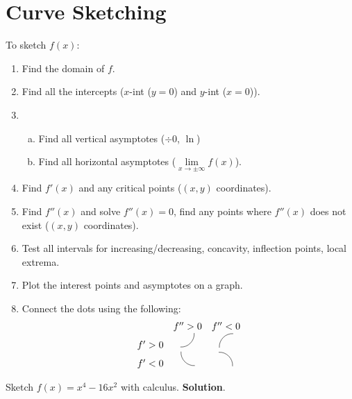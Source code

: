 \section{Curve Sketching}
To sketch $ f(x) $:
\begin{enumerate}[(1)]
    \item Find the domain of $ f $.
    \item Find all the intercepts ($ x $-int ($ y=0 $) and $ y $-int ($ x=0 $)).
    \item \begin{enumerate}[(a)]
              \item Find all vertical asymptotes ($ \div 0 $, $ \ln $)
              \item Find all horizontal asymptotes ($ \lim\limits_{{x} \to {\pm\infty}}f(x) $).
          \end{enumerate}
    \item Find $ f'(x) $ and any critical points ($ (x,y) $ coordinates).
    \item Find $ f''(x) $ and solve $ f''(x)=0 $, find any points where $ f''(x) $ does not exist ($ (x,y) $ coordinates).
    \item Test all intervals for increasing/decreasing, concavity, inflection points, local extrema.
    \item Plot the interest points and asymptotes on a graph.
    \item Connect the dots using the following:
          \[ \begin{array}{ccc}
                       & f''>0                                                      & f''<0                                                     \\
                  f'>0 & \tikz[scale=0.5]{\draw[-] (0,0) to [bend right=50] (1,1)}  & \tikz[scale=0.5]{\draw[-] (0,0) to [bend left=50] (1,1)}  \\
                  f'<0 & \tikz[scale=0.5]{\draw[-] (0,0) to [bend right=50] (1,-1)} & \tikz[scale=0.5]{\draw[-] (0,0) to [bend left=50] (1,-1)}
              \end{array} \]
\end{enumerate}
\begin{Example}{}{}
    Sketch $ f(x)=x^4-16x^2 $ with calculus.
    \tcblower{}
    \textbf{Solution}.

\end{Example}